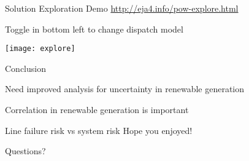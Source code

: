 \begin{frame}{Solution Exploration Demo}
\url{http://eja4.info/pow-explore.html}
\bi
\item Toggle in bottom left to change dispatch model
\ei
\begin{center}
\texttt{[image: explore]}
\end{center}
\end{frame}

\begin{frame}{Conclusion}
\bi
\item Need improved analysis for uncertainty in renewable generation
\item Correlation in renewable generation is important
\item Line failure risk vs system risk
\ei
\vspace{1cm}
Hope you enjoyed!

Questions?
\EBR
\end{frame}

